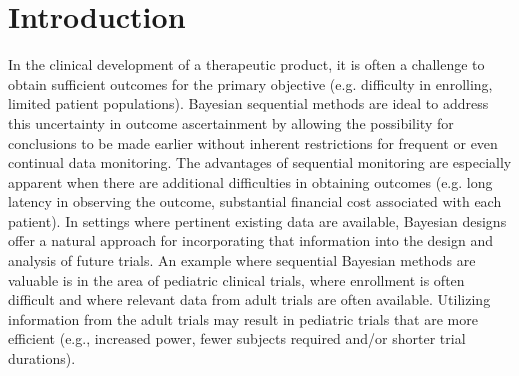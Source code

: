 \documentclass[useAMS,usenatbib,referee]{biom}
\begin{document}

%

\section{Introduction}
In the clinical development of a therapeutic product, it is often a challenge to obtain sufficient outcomes for the primary objective (e.g. difficulty in enrolling, limited patient populations). Bayesian sequential methods are ideal to address this uncertainty in outcome ascertainment by allowing the possibility for conclusions to be made earlier without inherent restrictions for frequent or even continual data monitoring. The advantages of sequential monitoring are especially apparent when there are additional difficulties in obtaining outcomes (e.g. long latency in observing the outcome, substantial financial cost associated with each patient). In settings where pertinent existing data are available, Bayesian designs offer a natural approach for incorporating that information into the design and analysis of future trials. An example where sequential Bayesian methods are valuable is in the area of pediatric clinical trials, where enrollment is often difficult and where relevant data from adult trials are often available. Utilizing information from the adult trials may result in pediatric trials that are more efficient (e.g., increased power, fewer subjects required and/or shorter trial durations).
\end{document}
